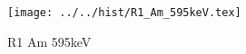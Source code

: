 \begin{figure}[h] \centering\texttt{[image: ../../hist/R1\_Am\_595keV.tex]}\caption{R1 Am 595keV}\label{hist:R1_Am_595keV} \end{figure}
